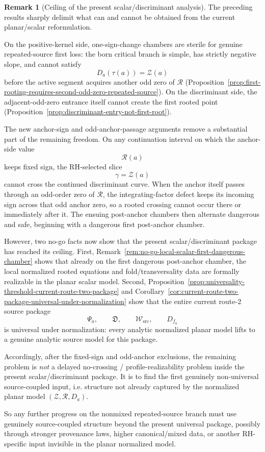 \documentclass[11pt,a4paper]{amsart}
\theoremstyle{plain}
\theoremstyle{definition}
\newtheorem{remark}[theorem]{Remark}
\begin{document}
\begin{remark}[Ceiling of the present scalar/discriminant analysis]
\label{rem:ceiling-present-scalar-discriminant-analysis}
The preceding results sharply delimit what can and cannot be obtained from the
current planar/scalar reformulation.

On the positive-kernel side, one-sign-change chambers are sterile for genuine
repeated-source first loss:
the born critical branch is simple, has strictly negative slope, and cannot
satisfy
\[
D_a(\tau(a))=\mathcal Z(a)
\]
before the active segment acquires another odd zero of $\mathcal R$
(Proposition~\ref{prop:first-rooting-requires-second-odd-zero-repeated-source}).
On the discriminant side, the adjacent-odd-zero entrance itself cannot create
the first rooted point
(Proposition~\ref{prop:discriminant-entry-not-first-root}).

The new anchor-sign and odd-anchor-passage arguments remove a substantial part
of the remaining freedom. On any continuation interval on which the anchor-side
value
\[
\mathcal R(a)
\]
keeps fixed sign, the RH-selected slice
\[
\gamma=\mathcal Z(a)
\]
cannot cross the continued discriminant curve. When the anchor itself passes
through an odd-order zero of $\mathcal R$, the integrating-factor defect keeps
its incoming sign across that odd anchor zero, so a rooted crossing cannot occur
there or immediately after it. The ensuing post-anchor chambers then alternate
dangerous and safe, beginning with a dangerous first post-anchor chamber.

However, two no-go facts now show that the present scalar/discriminant package
has reached its ceiling. First,
Remark~\ref{rem:no-go-local-scalar-first-dangerous-chamber} shows that already
on the first dangerous post-anchor chamber, the local normalized rooted
equations and fold/transversality data are formally realizable in the planar
scalar model. Second,
Proposition~\ref{prop:universality-threshold-current-route-two-package} and
Corollary~\ref{cor:current-route-two-package-universal-under-normalization}
show that the entire current route-2 source package
\[
\Psi_a,\qquad
\mathfrak D,\qquad
\mathcal W_{\mathrm{src}},\qquad
D_{f_a}
\]
is universal under normalization: every analytic normalized planar model lifts
to a genuine analytic source model for this package.

Accordingly, after the fixed-sign and odd-anchor exclusions, the remaining
problem is \emph{not} a delayed no-crossing / profile-realizability problem
inside the present scalar/discriminant package. It is to find the first
genuinely non-universal source-coupled input, i.e. structure not already
captured by the normalized planar model $(\mathcal Z,\mathcal R,D_a)$.

So any further progress on the nonmixed repeated-source branch must use
genuinely source-coupled structure beyond the present universal package,
possibly through stronger provenance laws, higher canonical/mixed data, or
another RH-specific input invisible in the planar normalized model.
\end{remark}
\end{document}

